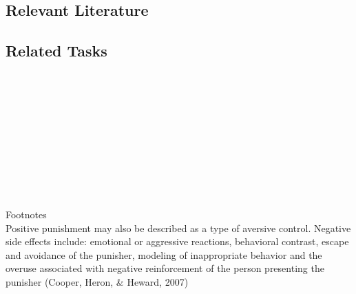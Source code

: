 \subsection{Relevant Literature}
\begin{refsection}
\nocite{test,alang2017police,clayton2018black}
\printbibliography[heading=none]
\end{refsection} 
%
\subsection{Related Tasks}
\fourdSixteen{}\\
\fourdFifteen{}\\
\fourdNineteen{}\\
\foureEleven{}\\
\fourgSeven{}\\
\fourjTen{}\\
\fourFKNineteen{}\\
\fourFKTwenty{}\\
\fourFKTwentyOne{}\\
\fourFKThirtyEight{}\\
%
Footnotes\\
Positive punishment may also be described as a type of aversive control. Negative side effects include: emotional or aggressive reactions, behavioral contrast, escape and avoidance of the punisher, modeling of inappropriate behavior and the overuse associated with negative reinforcement of the person presenting the punisher (Cooper, Heron, \& Heward, 2007)
%
%
%
%
%
%
%
%
